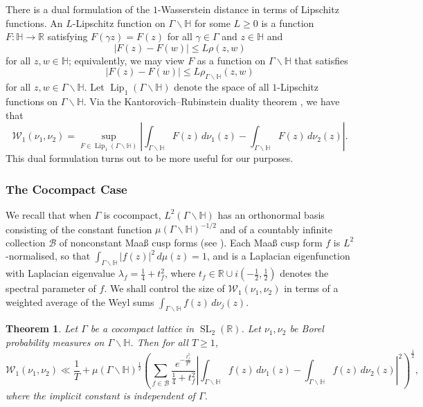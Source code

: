 \documentclass[11pt,a4paper]{amsart}
\newcommand{\BB}{\mathcal{B}}
\newcommand{\Hb}{\mathbb{H}}
\newcommand{\R}{\mathbb{R}}
\newcommand{\Wscr}{\mathscr{W}}
\DeclareMathOperator{\Lip}{Lip}
\DeclareMathOperator{\SL}{SL}
\numberwithin{equation}{section}
\newtheorem{theorem}[equation]{Theorem}
\theoremstyle{remark}
\theoremstyle{definition}
\begin{document}
There is a dual formulation of the $1$-Wasserstein distance in terms of Lipschitz functions. An $L$-Lipschitz function on $\Gamma \backslash \Hb$ for some $L \geq 0$ is a function $F : \Hb \to \R$ satisfying $F(\gamma z) = F(z)$ for all $\gamma \in \Gamma$ and $z \in \Hb$ and
\[|F(z) - F(w)| \leq L \rho(z,w)\]
for all $z,w \in \Hb$; equivalently, we may view $F$ as a function on $\Gamma \backslash \Hb$ that satisfies
\[|F(z) - F(w)| \leq L \rho_{\Gamma \backslash \Hb}(z,w)\]
for all $z,w \in \Gamma \backslash \Hb$. Let $\Lip_1(\Gamma \backslash \Hb)$ denote the space of all $1$-Lipschitz functions on $\Gamma \backslash \Hb$. Via the Kantorovich--Rubinstein duality theorem \cite[Theorem 1.3]{Vil03}, we have that
\begin{equation}
\label{eqn:KRduality}
\Wscr_1(\nu_1,\nu_2) = \sup_{F \in \Lip_1(\Gamma \backslash \Hb)} \left|\int_{\Gamma \backslash \Hb} F(z) \, d\nu_1(z) - \int_{\Gamma \backslash \Hb} F(z) \, d\nu_2(z)\right|.
\end{equation}
This dual formulation turns out to be more useful for our purposes.


\subsubsection{The Cocompact Case}

We recall that when $\Gamma$ is cocompact, $L^2(\Gamma \backslash \Hb)$ has an orthonormal basis consisting of the constant function $\mu(\Gamma \backslash \Hb)^{-1/2}$ and of a countably infinite collection $\BB$ of nonconstant Maa\ss{} cusp forms (see \cite[Chapter 4]{Iwa02}). Each Maa\ss{} cusp form $f$ is $L^2$-normalised, so that $\int_{\Gamma \backslash \Hb} |f(z)|^2 \, d\mu(z) = 1$, and is a Laplacian eigenfunction with Laplacian eigenvalue $\lambda_f = \frac{1}{4} + t_f^2$, where $t_f \in \R \cup i(-\frac{1}{2},\frac{1}{2})$ denotes the spectral parameter of $f$. We shall control the size of $\Wscr_1(\nu_1,\nu_2)$ in terms of a weighted average of the Weyl sums $\int_{\Gamma \backslash \Hb} f(z) \, d\nu_j(z)$.

\begin{theorem}
\label{thm:compact}
Let $\Gamma$ be a cocompact lattice in $\SL_2(\R)$. Let $\nu_1,\nu_2$ be Borel probability measures on $\Gamma \backslash \Hb$. Then for all $T \geq 1$,
\begin{equation}
\label{eqn:compact}
\Wscr_1(\nu_1,\nu_2) \ll \frac{1}{T} + \mu(\Gamma \backslash \Hb)^{\frac{1}{2}} \left(\sum_{f \in \BB} \frac{e^{-\frac{t_f^2}{T^2}}}{\frac{1}{4} + t_f^2} \left|\int_{\Gamma \backslash \Hb} f(z) \, d\nu_1(z) - \int_{\Gamma \backslash \Hb} f(z) \, d\nu_2(z)\right|^2 \right)^{\frac{1}{2}},
\end{equation}
where the implicit constant is independent of $\Gamma$.
\end{theorem}
\end{document}
